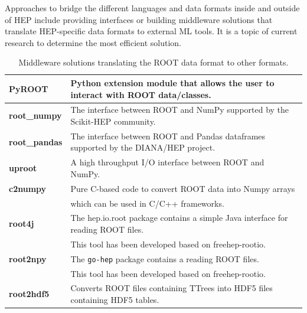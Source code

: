 Approaches to bridge the different languages and data formats inside and outside of HEP include providing interfaces or building middleware solutions that translate HEP-specific data formats to external ML tools. It is a topic of current research to determine the most efficient solution.

\begin{table}
 \caption{Middleware solutions translating the ROOT data format to other formats.}
 \begin{center}
  \begin{tabular}{|l|l|}
   \hline
   \textbf{PyROOT}       & Python extension module that allows the user to interact with ROOT data/classes.~\cite{PyROOT}          \\
   \hline
   \textbf{root\_numpy}  & The interface between ROOT and NumPy supported by the Scikit-HEP community.~\cite{root_numpy}           \\
   \hline
   \textbf{root\_pandas} & The interface between ROOT and Pandas dataframes supported by the DIANA/HEP project.~\cite{root_pandas} \\
   \hline
   \textbf{uproot}       & A high throughput I/O interface between ROOT and NumPy.~\cite{uproot}                                   \\
   \hline
   \textbf{c2numpy}      & Pure C-based code to convert ROOT data into Numpy arrays                                                \\
                         & which can be used in C/C++ frameworks.~\cite{c2numpy}                                                   \\
   \hline

   \textbf{root4j}       & The hep.io.root package contains a simple Java interface for reading ROOT files.                        \\
                         & This tool has been developed based on freehep-rootio.~\cite{root4j}                                     \\
   \hline

   \textbf{root2npy}     & The \texttt{go-hep} package contains a reading ROOT files.                                              \\
                         & This tool has been developed based on freehep-rootio.~\cite{root4j}                                     \\
   \hline

   \textbf{root2hdf5}    & Converts ROOT files containing TTrees into HDF5 files containing HDF5 tables.~\cite{root2hdf5}          \\
   \hline
  \end{tabular}
 \end{center}
 \label{table:Middleware}
\end{table}

